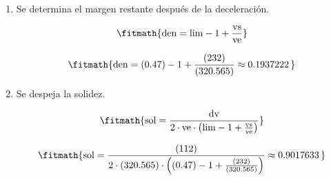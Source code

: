 \begin{enumerate}

\item Se determina el margen restante después de la deceleración.

\[\fitmath{\mathrm{den}=\mathrm{lim}-1+\frac{\mathrm{vs}}{\mathrm{ve}}}\]

\[\fitmath{\mathrm{den}=(0.47)-1+\frac{(232)}{(320.565)}\approx 0.1937222\,}\]

\item Se despeja la solidez.

\[\fitmath{\mathrm{sol}=\frac{\mathrm{dv}}{2\cdot \mathrm{ve}\cdot \left(\mathrm{lim}-1+\frac{\mathrm{vs}}{\mathrm{ve}}\right)}}\]

\[\fitmath{\mathrm{sol}=\frac{(112)}{2\cdot (320.565)\cdot \left((0.47)-1+\frac{(232)}{(320.565)}\right)}\approx 0.9017633\,}\]

\end{enumerate}
